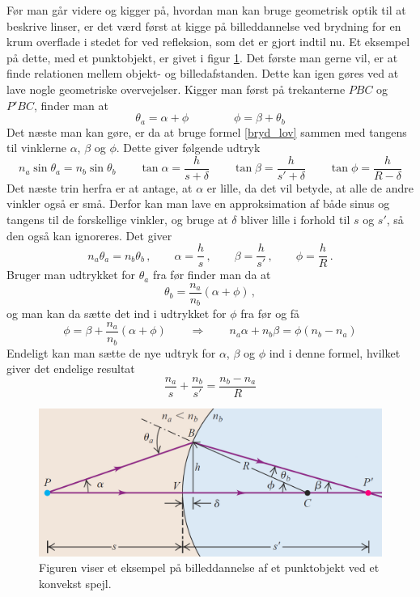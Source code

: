 Før man går videre og kigger på, hvordan man kan bruge geometrisk optik til at beskrive linser, er det værd først at kigge på billeddannelse ved brydning for en krum overflade i stedet for ved refleksion, som det er gjort indtil nu. Et eksempel på dette, med et punktobjekt, er givet i figur \ref{konveks_brydning}. Det første man gerne vil, er at finde relationen mellem objekt- og billedafstanden. Dette kan igen gøres ved at lave nogle geometriske overvejelser. Kigger man først på trekanterne $PBC$ og $P'BC$, finder man at
$$\theta_a = \alpha + \phi \quad \quad \quad \quad \phi = \beta + \theta_b$$
Det næste man kan gøre, er da at bruge formel \eqref{bryd_lov} sammen med tangens til vinklerne $\alpha$, $\beta$ og $\phi$. Dette giver følgende udtryk
$$n_a \sin \theta_a = n_b \sin \theta_b \quad \quad \tan \alpha = \frac{h}{s + \delta} \quad \quad \tan \beta = \frac{h}{s' + \delta} \quad \quad \tan \phi = \frac{h}{R - \delta}$$
Det næste trin herfra er at antage, at $\alpha$ er lille, da det vil betyde, at alle de andre vinkler også er små. Derfor kan man lave en approksimation af både sinus og tangens til de forskellige vinkler, og bruge at $\delta$ bliver lille i forhold til $s$ og $s'$, så den også kan ignoreres. Det giver
$$n_a \theta_a = n_b \theta_b \, , \quad \quad \alpha = \frac{h}{s} \, , \quad \quad \beta = \frac{h}{s'} \, , \quad \quad \phi = \frac{h}{R} \, . $$
Bruger man udtrykket for $\theta_a$ fra før finder man da at
$$ \theta_b = \frac{n_a}{n_b} \left( \alpha + \phi \right) \, ,$$
og man kan da sætte det ind i udtrykket for $\phi$ fra før og få
$$\phi = \beta +  \frac{n_a}{n_b} \left( \alpha + \phi \right) \quad \quad \Rightarrow \quad \quad n_a\alpha + n_b \beta = \phi \left( n_b - n_a \right)$$
Endeligt kan man sætte de nye udtryk for $\alpha$, $\beta$ og $\phi$ ind i denne formel, hvilket giver det endelige resultat
\begin{equation}
\frac{n_a}{s} + \frac{n_b}{s'} = \frac{n_b - n_a}{R} 
\label{ref_til_jacob2}
\end{equation}
\begin{figure}[h!]
	\centering
	\includegraphics[scale=0.27]{Geometrisk-Optik/konveks_brydning.PNG}
	\caption{Figuren viser et eksempel på billeddannelse af et punktobjekt ved et konvekst spejl.}
	\label{konveks_brydning}
\end{figure}

